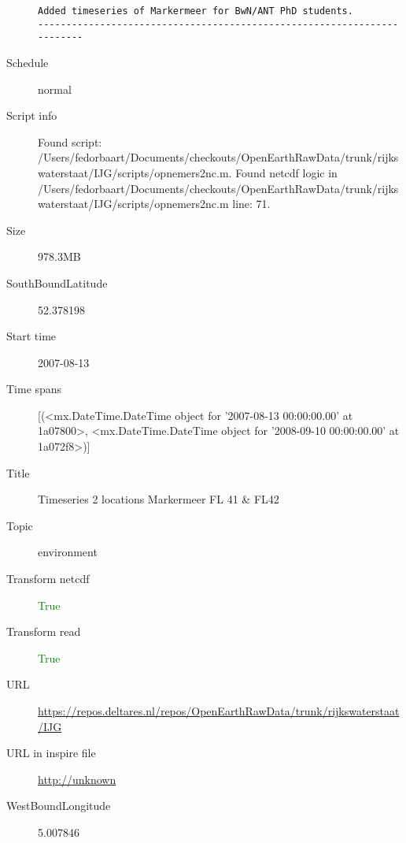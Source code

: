 \documentclass[9]{report}
\begin{document}
\begin{description}
\begin{verbatim}
Added timeseries of Markermeer for BwN/ANT PhD students.
------------------------------------------------------------------------

\end{verbatim}
  \item[Schedule] normal
  \item[Script info] Found script: /Users/fedorbaart/Documents/checkouts/OpenEarthRawData/trunk/rijkswaterstaat/IJG/scripts/opnemers2nc.m.
Found netcdf logic in /Users/fedorbaart/Documents/checkouts/OpenEarthRawData/trunk/rijkswaterstaat/IJG/scripts/opnemers2nc.m line: 71.
  \item[Size] 978.3MB
  \item[SouthBoundLatitude] 52.378198
  \item[Start time] 2007-08-13
  \item[Time spans] [(<mx.DateTime.DateTime object for '2007-08-13 00:00:00.00' at 1a07800>, <mx.DateTime.DateTime object for '2008-09-10 00:00:00.00' at 1a072f8>)]
  \item[Title]  Timeseries 2 locations Markermeer FL 41 \& FL42 
  \item[Topic] environment
  \item[Transform netcdf] \textcolor{green}{True}
  \item[Transform read] \textcolor{green}{True}
  \item[URL] \href{https://repos.deltares.nl/repos/OpenEarthRawData/trunk/rijkswaterstaat/IJG}{https://repos.deltares.nl/repos/OpenEarthRawData/trunk/rijkswaterstaat/IJG}
  \item[URL in inspire file] \href{http://unknown}{http://unknown}
  \item[WestBoundLongitude] 5.007846
\end{description}
\end{document}
